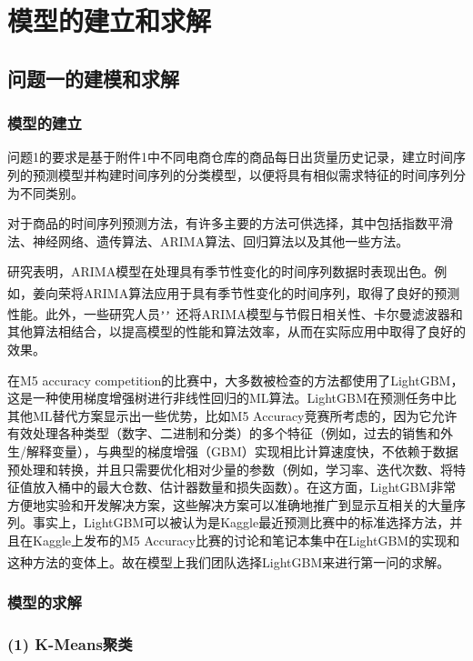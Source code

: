 \documentclass[withoutpreface,bwprint]{cumcmthesis}
\begin{document}
\section{模型的建立和求解}
\subsection{问题一的建模和求解}
\subsubsection{模型的建立}
    问题1的要求是基于附件1中不同电商仓库的商品每日出货量历史记录，建立时间序列的预测模型并构建时间序列的分类模型，以便将具有相似需求特征的时间序列分为不同类别。
    
    对于商品的时间序列预测方法，有许多主要的方法可供选择，其中包括指数平滑法、神经网络、遗传算法、ARIMA算法、回归算法以及其他一些方法。

    研究表明，ARIMA模型在处理具有季节性变化的时间序列数据时表现出色。例如，姜向荣\textsuperscript{\cite{a}}将ARIMA算法应用于具有季节性变化的时间序列，取得了良好的预测性能。此外，一些研究人员\textsuperscript{\cite{b}，\cite{c}，\cite{d}}还将ARIMA模型与节假日相关性、卡尔曼滤波器和其他算法相结合，以提高模型的性能和算法效率，从而在实际应用中取得了良好的效果。

    在M5 accuracy competition的比赛中，大多数被检查的方法都使用了LightGBM，这是一种使用梯度增强树进行非线性回归的ML算法。LightGBM在预测任务中比其他ML替代方案显示出一些优势，比如M5 Accuracy竞赛所考虑的，因为它允许有效处理各种类型（数字、二进制和分类）的多个特征（例如，过去的销售和外生/解释变量），与典型的梯度增强（GBM）实现相比计算速度快，不依赖于数据预处理和转换，并且只需要优化相对少量的参数（例如，学习率、迭代次数、将特征值放入桶中的最大仓数、估计器数量和损失函数）。在这方面，LightGBM非常方便地实验和开发解决方案，这些解决方案可以准确地推广到显示互相关的大量序列。事实上，LightGBM可以被认为是Kaggle最近预测比赛中的标准选择方法，并且在Kaggle上发布的M5 Accuracy比赛的讨论和笔记本集中在LightGBM的实现和这种方法的变体上。\textsuperscript{\cite{e}}故在模型上我们团队选择LightGBM来进行第一问的求解。
    
\subsubsection{模型的求解}
     \subsubsection*{(1) K-Means聚类}
\end{document}
